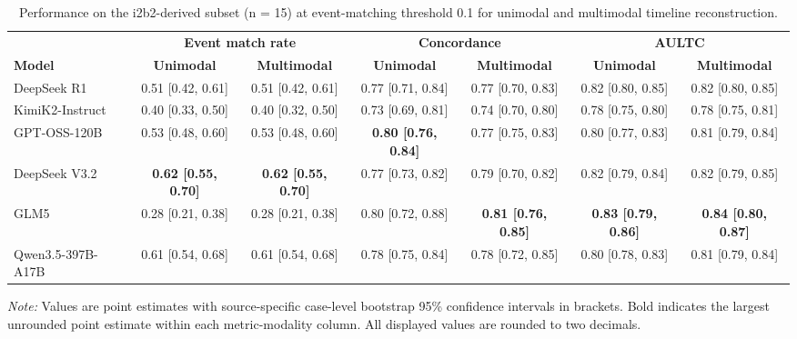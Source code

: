 \begin{table}[htbp]
\caption{Performance on the i2b2-derived subset (n = 15) at event-matching threshold 0.1 for unimodal and multimodal timeline reconstruction.}
\ChEightTableBodyStart
\begin{ChEightFloatBody}


\centering
\scriptsize
\begin{adjustbox}{max width=\textwidth}
\begin{tabular}{@{}lcccccc@{}}
\toprule
& \multicolumn{2}{c}{\textbf{Event match rate}} & \multicolumn{2}{c}{\textbf{Concordance}} & \multicolumn{2}{c}{\textbf{AULTC}} \\
\cmidrule(lr){2-3}\cmidrule(lr){4-5}\cmidrule(l){6-7}
\textbf{Model} & \textbf{Unimodal} & \textbf{Multimodal} & \textbf{Unimodal} & \textbf{Multimodal} & \textbf{Unimodal} & \textbf{Multimodal} \\
\midrule
DeepSeek R1 & 0.51 [0.42, 0.61] & 0.51 [0.42, 0.61] & 0.77 [0.71, 0.84] & 0.77 [0.70, 0.83] & 0.82 [0.80, 0.85] & 0.82 [0.80, 0.85] \\
KimiK2-Instruct & 0.40 [0.33, 0.50] & 0.40 [0.32, 0.50] & 0.73 [0.69, 0.81] & 0.74 [0.70, 0.80] & 0.78 [0.75, 0.80] & 0.78 [0.75, 0.81] \\
GPT-OSS-120B & 0.53 [0.48, 0.60] & 0.53 [0.48, 0.60] & \textbf{0.80 [0.76, 0.84]} & 0.77 [0.75, 0.83] & 0.80 [0.77, 0.83] & 0.81 [0.79, 0.84] \\
DeepSeek V3.2 & \textbf{0.62 [0.55, 0.70]} & \textbf{0.62 [0.55, 0.70]} & 0.77 [0.73, 0.82] & 0.79 [0.70, 0.82] & 0.82 [0.79, 0.84] & 0.82 [0.79, 0.85] \\
GLM5 & 0.28 [0.21, 0.38] & 0.28 [0.21, 0.38] & 0.80 [0.72, 0.88] & \textbf{0.81 [0.76, 0.85]} & \textbf{0.83 [0.79, 0.86]} & \textbf{0.84 [0.80, 0.87]} \\
Qwen3.5-397B-A17B & 0.61 [0.54, 0.68] & 0.61 [0.54, 0.68] & 0.78 [0.75, 0.84] & 0.78 [0.72, 0.85] & 0.80 [0.78, 0.83] & 0.81 [0.79, 0.84] \\
\bottomrule
\end{tabular}
\end{adjustbox}
\par
\begin{minipage}{\textwidth}
\footnotesize\textit{Note:} Values are point estimates with source-specific case-level bootstrap 95\% confidence intervals in brackets. Bold indicates the largest unrounded point estimate within each metric-modality column. All displayed values are rounded to two decimals.
\end{minipage}

\end{ChEightFloatBody}
\end{table}